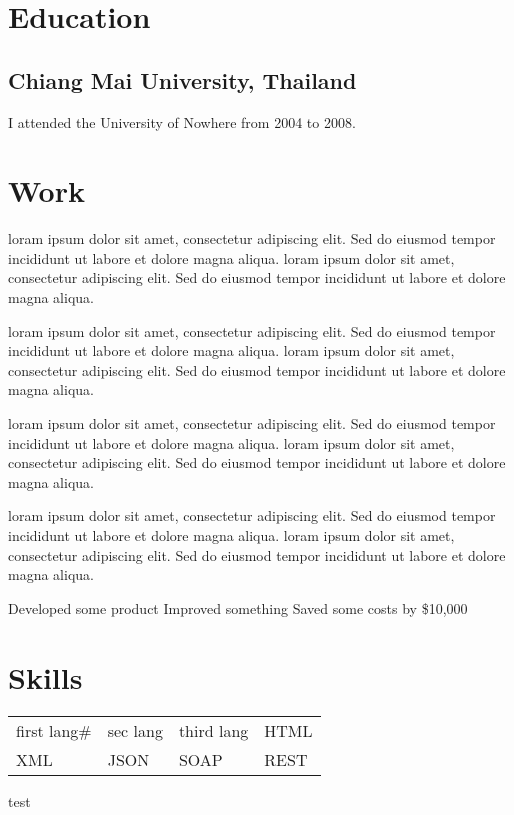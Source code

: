 \documentclass{cleanformat}
\begin{document}


\section{Education}

\subsection{Chiang Mai University, Thailand}

I attended the University of Nowhere from 2004 to 2008.

\section{Work}
loram ipsum dolor sit amet, consectetur adipiscing elit. 
Sed do eiusmod tempor incididunt ut labore et dolore magna aliqua.
loram ipsum dolor sit amet, consectetur adipiscing elit.	
Sed do eiusmod tempor incididunt ut labore et dolore magna aliqua.

loram ipsum dolor sit amet, consectetur adipiscing elit. 
Sed do eiusmod tempor incididunt ut labore et dolore magna aliqua.
loram ipsum dolor sit amet, consectetur adipiscing elit.	
Sed do eiusmod tempor incididunt ut labore et dolore magna aliqua.

loram ipsum dolor sit amet, consectetur adipiscing elit. 
Sed do eiusmod tempor incididunt ut labore et dolore magna aliqua.
loram ipsum dolor sit amet, consectetur adipiscing elit.	
Sed do eiusmod tempor incididunt ut labore et dolore magna aliqua.

loram ipsum dolor sit amet, consectetur adipiscing elit. 
Sed do eiusmod tempor incididunt ut labore et dolore magna aliqua.
loram ipsum dolor sit amet, consectetur adipiscing elit.	
Sed do eiusmod tempor incididunt ut labore et dolore magna aliqua.


\workitems
{Developed some product}
{Improved something}
{Saved some costs by \$10,000}

\section{Skills}

\begin{tabular}{l l l l}
first lang\# & sec lang & third lang & HTML \\
XML & JSON & SOAP & REST
\end{tabular}


\begin{center}
	test
\end{center}
\end{document}
